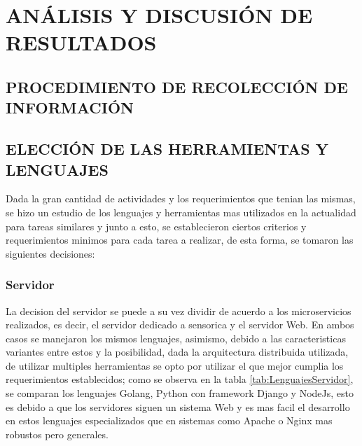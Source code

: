 \thispagestyle{empty}

\section{ANÁLISIS Y DISCUSIÓN DE RESULTADOS}

\subsection{PROCEDIMIENTO DE RECOLECCIÓN DE INFORMACIÓN}

\subsection{ELECCIÓN DE LAS HERRAMIENTAS Y LENGUAJES}
    Dada la gran cantidad de actividades y los requerimientos que tenian las mismas,
    se hizo un estudio de los lenguajes y herramientas mas utilizados en
    la actualidad para tareas similares y junto a esto, se establecieron
    ciertos criterios y requerimientos minimos para cada tarea a realizar, de
    esta forma, se tomaron las siguientes decisiones:

    \subsubsection{Servidor}
    La decision del servidor se puede a su vez dividir de acuerdo a los
    microservicios realizados, es decir, el servidor dedicado a sensorica y
    el servidor Web. En ambos casos se manejaron los mismos lenguajes, asimismo, debido a
    las caracteristicas variantes entre estos y la posibilidad, dada la arquitectura
    distribuida utilizada, de utilizar multiples herramientas se opto por utilizar
    el que mejor cumplia los requerimientos establecidos; como se observa en la
    tabla \ref{tab:LenguajesServidor}, se comparan los lenguajes Golang, Python
    con framework Django y NodeJs, esto es debido a que los servidores siguen un
    sistema Web y es mas facil el desarrollo en estos lenguajes especializados que
    en sistemas como Apache o Nginx mas robustos pero generales.

